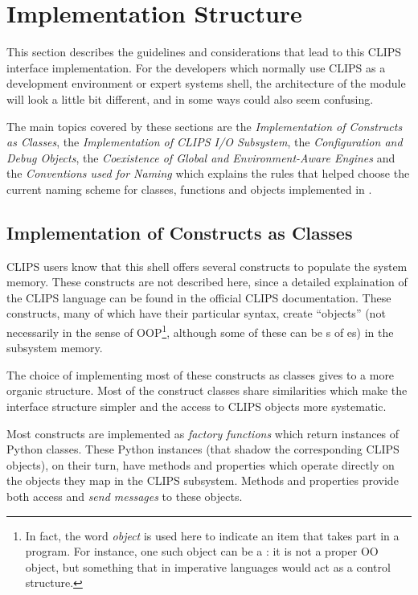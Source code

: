 \section{Implementation Structure\label{pyclips-implstructure}}

This section describes the guidelines and considerations that lead
to this CLIPS interface implementation. For the developers which
normally use CLIPS as a development environment or expert systems
shell, the architecture of the \pyclips{} module will look a little
bit different, and in some ways could also seem confusing.

The main topics covered by these sections are the \emph{Implementation
of Constructs as Classes}, the \emph{Implementation of CLIPS I/O
Subsystem}, the \emph{Configuration and Debug Objects}, the
\emph{Coexistence of Global and Environment-Aware Engines} and the
\emph{Conventions used for Naming} which explains the rules that
helped choose the current naming scheme for classes, functions and
objects implemented in \pyclips{}.


\subsection{Implementation of Constructs as Classes\label{pyclips-ov-casc}}

CLIPS users know that this shell offers several constructs to populate
the system memory. These constructs are not described here, since a
detailed explaination of the CLIPS language can be found in the
official CLIPS documentation. These constructs, many of which have
their particular syntax, create ``objects'' (not necessarily in the
sense of OOP\footnote{In fact, the word \emph{object} is used here
to indicate an item that takes part in a program. For instance, one
such object can be a : it is not a proper OO object,
but something that in imperative languages would act as a control
structure.}, although some of these can be s of
es) in the subsystem memory.

The choice of implementing most of these constructs as classes gives
to \pyclips{} a more organic structure. Most of the construct classes
share similarities which make the interface structure simpler and the
access to CLIPS objects more systematic.

Most constructs are implemented as \emph{factory functions} which
return instances of Python classes. These Python instances (that
shadow the corresponding CLIPS objects), on their turn, have methods
and properties which operate directly on the objects they map in the
CLIPS subsystem. Methods and properties provide both access and
\emph{send messages} to these objects.

